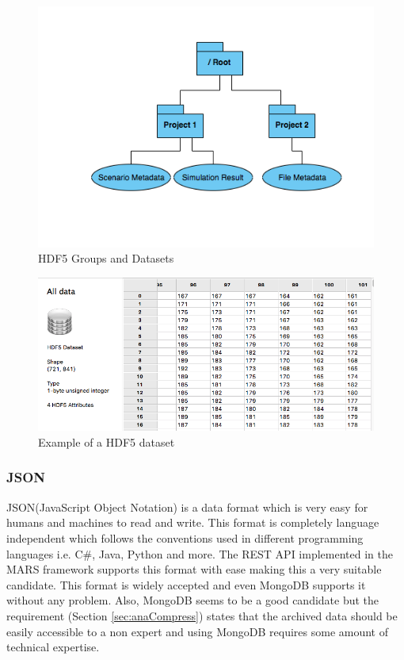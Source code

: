 \begin{figure}[H]
    \centering \includegraphics[scale=0.6]{grafiken/groupsHDF5.png}
    \caption{HDF5 Groups and Datasets \cite{HDF5}}
    \label{fig:HDF5}
\end{figure}

\begin{figure}[H]
    \centering \includegraphics[scale=0.45]{grafiken/dataset.png}
    \caption{Example of a HDF5 dataset}
    \label{fig:dataset}
\end{figure}

\subsubsection{JSON} 
JSON(JavaScript Object Notation) is a data format which is very easy for humans and machines to read and write. This format is
completely language independent which follows the conventions used in different programming languages i.e. C\#, Java, Python and more. The REST API implemented in the
MARS framework supports this format with ease making this a very suitable candidate. This format is widely 
accepted and even MongoDB supports it without any problem. Also, MongoDB seems to be a good candidate but the requirement (Section \ref{sec:anaCompress}) states that the archived
data should be easily accessible to a non expert and using MongoDB requires some amount of technical expertise.


